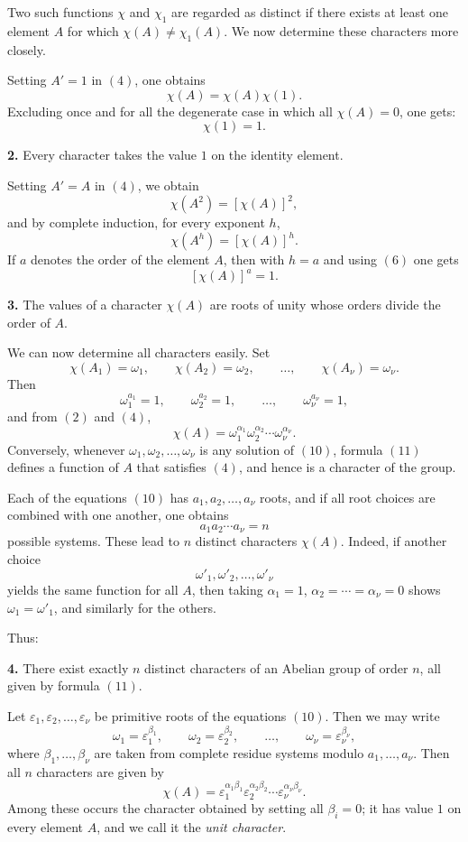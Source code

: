 \documentclass[11pt,a4paper]{book}
\begin{document}
Two such functions \(\chi\) and \(\chi_1\) are regarded as distinct if there exists at least one element \(A\) for which \(\chi(A)\neq \chi_1(A)\). We now determine these characters more closely.

Setting \(A'=1\) in \((4)\), one obtains
\[
\chi(A)=\chi(A)\chi(1).
\tag{5}
\]
Excluding once and for all the degenerate case in which all \(\chi(A)=0\), one gets:
\[
\chi(1)=1.
\tag{6}
\]

\medskip
\noindent\textbf{2.} Every character takes the value \(1\) on the identity element.

\medskip
Setting \(A'=A\) in \((4)\), we obtain
\[
\chi(A^2)=[\chi(A)]^2,
\]
and by complete induction, for every exponent \(h\),
\[
\chi(A^h)=[\chi(A)]^h.
\tag{7}
\]
If \(a\) denotes the order of the element \(A\), then with \(h=a\) and using \((6)\) one gets
\[
[\chi(A)]^a=1.
\tag{8}
\]

\medskip
\noindent\textbf{3.} The values of a character \(\chi(A)\) are roots of unity whose orders divide the order of \(A\).

\medskip
We can now determine all characters easily. Set
\[
\chi(A_1)=\omega_1,\qquad \chi(A_2)=\omega_2,\qquad \dots,\qquad \chi(A_\nu)=\omega_\nu.
\tag{9}
\]
Then
\[
\omega_1^{a_1}=1,\qquad \omega_2^{a_2}=1,\qquad \dots,\qquad \omega_\nu^{a_\nu}=1,
\tag{10}
\]
and from \((2)\) and \((4)\),
\[
\chi(A)=\omega_1^{\alpha_1}\omega_2^{\alpha_2}\cdots \omega_\nu^{\alpha_\nu}.
\tag{11}
\]
Conversely, whenever \(\omega_1,\omega_2,\dots,\omega_\nu\) is any solution of \((10)\), formula \((11)\) defines a function of \(A\) that satisfies \((4)\), and hence is a character of the group.

Each of the equations \((10)\) has \(a_1,a_2,\dots,a_\nu\) roots, and if all root choices are combined with one another, one obtains
\[
a_1a_2\cdots a_\nu=n
\]
possible systems. These lead to \(n\) distinct characters \(\chi(A)\). Indeed, if another choice
\[
\omega'_1,\omega'_2,\dots,\omega'_\nu
\]
yields the same function for all \(A\), then taking \(\alpha_1=1\), \(\alpha_2=\cdots=\alpha_\nu=0\) shows \(\omega_1=\omega'_1\), and similarly for the others.

Thus:

\medskip
\noindent\textbf{4.} There exist exactly \(n\) distinct characters of an Abelian group of order \(n\), all given by formula \((11)\).

\medskip
Let \(\varepsilon_1,\varepsilon_2,\dots,\varepsilon_\nu\) be primitive roots of the equations \((10)\). Then we may write
\[
\omega_1=\varepsilon_1^{\beta_1},\qquad \omega_2=\varepsilon_2^{\beta_2},\qquad \dots,\qquad \omega_\nu=\varepsilon_\nu^{\beta_\nu},
\tag{12}
\]
where \(\beta_1,\dots,\beta_\nu\) are taken from complete residue systems modulo \(a_1,\dots,a_\nu\). Then all \(n\) characters are given by
\[
\chi(A)=\varepsilon_1^{\alpha_1\beta_1}\varepsilon_2^{\alpha_2\beta_2}\cdots\varepsilon_\nu^{\alpha_\nu\beta_\nu}.
\tag{13}
\]
Among these occurs the character obtained by setting all \(\beta_i=0\); it has value \(1\) on every element \(A\), and we call it the \emph{unit character}.
\end{document}
